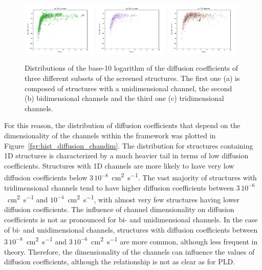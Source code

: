 \documentclass[main]{subfiles}
\begin{document}
\begin{figure}[ht]
  \centering
    \includegraphics[width=0.32\textwidth]{figures/5-diffusion/D_log-PLD_1D_chan.pdf}
    \includegraphics[width=0.32\textwidth]{figures/5-diffusion/D_log-PLD_2D_chan.pdf}
    \includegraphics[width=0.32\textwidth]{figures/5-diffusion/D_log-PLD_3D_chan.pdf}
    \caption{ Distributions of the base-10 logarithm of the diffusion coefficients of three different subsets of the screened structures. The first one (a) is composed of structures with a unidimensional channel, the second (b) bidimensional channels and the third one (c) tridimensional channels. }\label{fgr:scatter_diffusion_chandim}
\end{figure}

For this reason, the distribution of diffusion coefficients that depend on the dimensionality of the channels within the framework was plotted in Figure~\ref{fgr:hist_diffusion_chandim}. The distribution for structures containing 1D structures is characterized by a much heavier tail in terms of low diffusion coefficients. Structures with 1D channels are more likely to have very low diffusion coefficients below $3\,10^{-8}$~\si{\square\cm\per\s}. The vast majority of structures with tridimensional channels tend to have higher diffusion coefficients between $3\,10^{-6}$~\si{\square\cm\per\s} and $10^{-4}$~\si{\square\cm\per\s}, with almost very few structures having lower diffusion coefficients. The influence of channel dimensionality on diffusion coefficients is not as pronounced for bi- and unidimensional channels. In the case of bi- and unidimensional channels, structures with diffusion coefficients between $3\,10^{-8}$~\si{\square\cm\per\s} and $3\,10^{-6}$~\si{\square\cm\per\s} are more common, although less frequent in theory. Therefore, the dimensionality of the channels can influence the values of diffusion coefficients, although the relationship is not as clear as for PLD.
\end{document}
